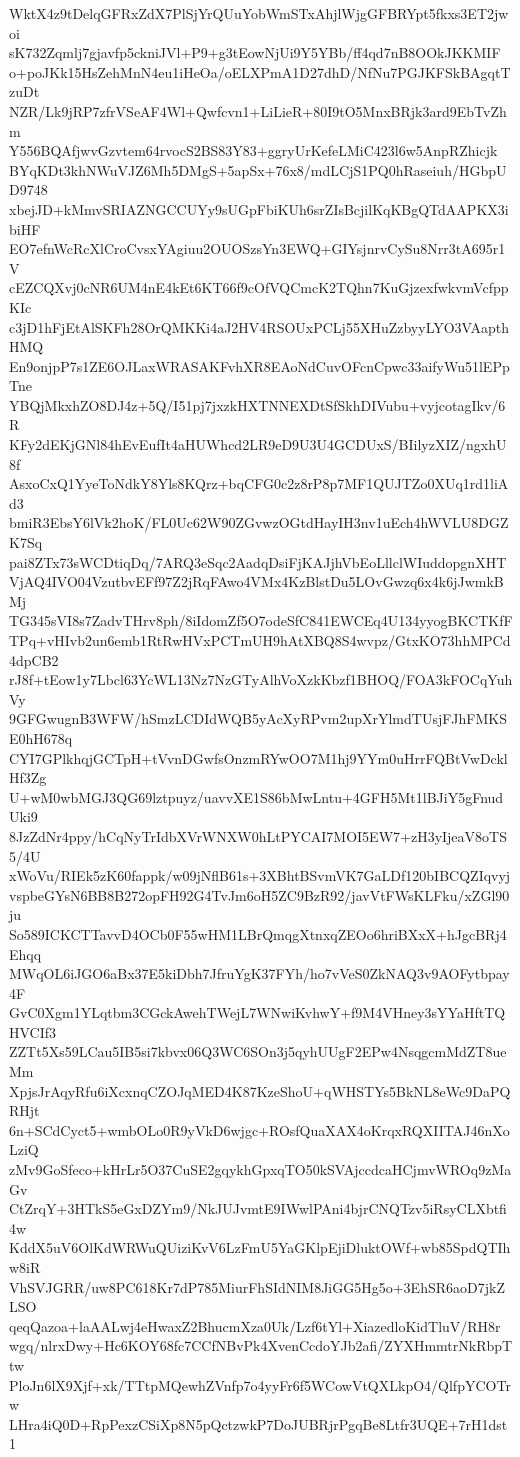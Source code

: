 WktX4z9tDelqGFRxZdX7PlSjYrQUuYobWmSTxAhjlWjgGFBRYpt5fkxs3ET2jwoi
sK732Zqmlj7gjavfp5ckniJVl+P9+g3tEowNjUi9Y5YBb/ff4qd7nB8OOkJKKMIF
o+poJKk15HsZehMnN4eu1iHeOa/oELXPmA1D27dhD/NfNu7PGJKFSkBAgqtTzuDt
NZR/Lk9jRP7zfrVSeAF4Wl+Qwfcvn1+LiLieR+80I9tO5MnxBRjk3ard9EbTvZhm
Y556BQAfjwvGzvtem64rvocS2BS83Y83+ggryUrKefeLMiC423l6w5AnpRZhicjk
BYqKDt3khNWuVJZ6Mh5DMgS+5apSx+76x8/mdLCjS1PQ0hRaseiuh/HGbpUD9748
xbejJD+kMmvSRIAZNGCCUYy9sUGpFbiKUh6srZIsBcjilKqKBgQTdAAPKX3ibiHF
EO7efnWcRcXlCroCvsxYAgiuu2OUOSzsYn3EWQ+GIYsjnrvCySu8Nrr3tA695r1V
cEZCQXvj0cNR6UM4nE4kEt6KT66f9cOfVQCmcK2TQhn7KuGjzexfwkvmVcfppKIc
c3jD1hFjEtAlSKFh28OrQMKKi4aJ2HV4RSOUxPCLj55XHuZzbyyLYO3VAapthHMQ
En9onjpP7s1ZE6OJLaxWRASAKFvhXR8EAoNdCuvOFcnCpwc33aifyWu51lEPpTne
YBQjMkxhZO8DJ4z+5Q/I51pj7jxzkHXTNNEXDtSfSkhDIVubu+vyjcotagIkv/6R
KFy2dEKjGNl84hEvEufIt4aHUWhcd2LR9eD9U3U4GCDUxS/BIilyzXIZ/ngxhU8f
AsxoCxQ1YyeToNdkY8Yls8KQrz+bqCFG0c2z8rP8p7MF1QUJTZo0XUq1rd1liAd3
bmiR3EbsY6lVk2hoK/FL0Uc62W90ZGvwzOGtdHayIH3nv1uEch4hWVLU8DGZK7Sq
pai8ZTx73sWCDtiqDq/7ARQ3eSqc2AadqDsiFjKAJjhVbEoLllclWIuddopgnXHT
VjAQ4IVO04VzutbvEFf97Z2jRqFAwo4VMx4KzBlstDu5LOvGwzq6x4k6jJwmkBMj
TG345sVI8s7ZadvTHrv8ph/8iIdomZf5O7odeSfC841EWCEq4U134yyogBKCTKfF
TPq+vHIvb2un6emb1RtRwHVxPCTmUH9hAtXBQ8S4wvpz/GtxKO73hhMPCd4dpCB2
rJ8f+tEow1y7Lbcl63YcWL13Nz7NzGTyAlhVoXzkKbzf1BHOQ/FOA3kFOCqYuhVy
9GFGwugnB3WFW/hSmzLCDIdWQB5yAcXyRPvm2upXrYlmdTUsjFJhFMKSE0hH678q
CYI7GPlkhqjGCTpH+tVvnDGwfsOnzmRYwOO7M1hj9YYm0uHrrFQBtVwDcklHf3Zg
U+wM0wbMGJ3QG69lztpuyz/uavvXE1S86bMwLntu+4GFH5Mt1lBJiY5gFnudUki9
8JzZdNr4ppy/hCqNyTrIdbXVrWNXW0hLtPYCAI7MOI5EW7+zH3yIjeaV8oTS5/4U
xWoVu/RIEk5zK60fappk/w09jNflB61s+3XBhtBSvmVK7GaLDf120bIBCQZIqvyj
vspbeGYsN6BB8B272opFH92G4TvJm6oH5ZC9BzR92/javVtFWsKLFku/xZGl90ju
So589ICKCTTavvD4OCb0F55wHM1LBrQmqgXtnxqZEOo6hriBXxX+hJgcBRj4Ehqq
MWqOL6iJGO6aBx37E5kiDbh7JfruYgK37FYh/ho7vVeS0ZkNAQ3v9AOFytbpay4F
GvC0Xgm1YLqtbm3CGckAwehTWejL7WNwiKvhwY+f9M4VHney3sYYaHftTQHVCIf3
ZZTt5Xs59LCau5IB5si7kbvx06Q3WC6SOn3j5qyhUUgF2EPw4NsqgcmMdZT8ueMm
XpjsJrAqyRfu6iXcxnqCZOJqMED4K87KzeShoU+qWHSTYs5BkNL8eWc9DaPQRHjt
6n+SCdCyct5+wmbOLo0R9yVkD6wjgc+ROsfQuaXAX4oKrqxRQXIITAJ46nXoLziQ
zMv9GoSfeco+kHrLr5O37CuSE2gqykhGpxqTO50kSVAjccdcaHCjmvWROq9zMaGv
CtZrqY+3HTkS5eGxDZYm9/NkJUJvmtE9IWwlPAni4bjrCNQTzv5iRsyCLXbtfi4w
KddX5uV6OlKdWRWuQUiziKvV6LzFmU5YaGKlpEjiDluktOWf+wb85SpdQTIhw8iR
VhSVJGRR/uw8PC618Kr7dP785MiurFhSIdNIM8JiGG5Hg5o+3EhSR6aoD7jkZLSO
qeqQazoa+laAALwj4eHwaxZ2BhucmXza0Uk/Lzf6tYl+XiazedloKidTluV/RH8r
wgq/nlrxDwy+Hc6KOY68fc7CCfNBvPk4XvenCcdoYJb2afi/ZYXHmmtrNkRbpTtw
PloJn6lX9Xjf+xk/TTtpMQewhZVnfp7o4yyFr6f5WCowVtQXLkpO4/QlfpYCOTrw
LHra4iQ0D+RpPexzCSiXp8N5pQctzwkP7DoJUBRjrPgqBe8Ltfr3UQE+7rH1dst1
